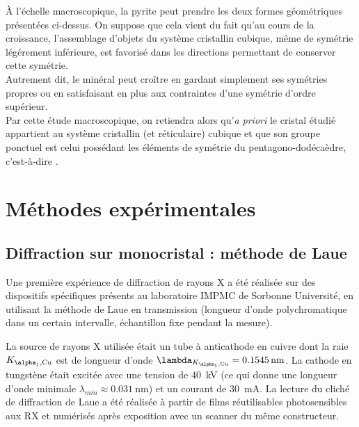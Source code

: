 À l'échelle macroscopique, la pyrite peut prendre les deux formes géométriques présentées ci-dessus. On suppose que cela vient du fait qu'au cours de la croissance, l'assemblage d'objets du système cristallin cubique, même de symétrie légérement inférieure, est favorisé dans les directions permettant de conserver cette symétrie.\\
Autrement dit, le minéral peut croître en gardant simplement ses symétries propres ou en satisfaisant en plus aux contraintes d'une symétrie d'ordre supérieur.\\
Par cette étude macroscopique, on retiendra alors qu'\textit{a priori} le cristal étudié appartient au système cristallin (et réticulaire) cubique et que son groupe ponctuel est celui possédant les éléments de symétrie du pentagono-dodécaèdre, c'est-à-dire .

\section{Méthodes expérimentales}

\subsection{Diffraction sur monocristal : méthode de Laue}

Une première expérience de diffraction de rayons X a été réalisée sur des dispositifs spécifiques présents au laboratoire IMPMC de Sorbonne Université, en utilisant la méthode de Laue en transmission (longueur d'onde polychromatique dans un certain intervalle, échantillon fixe pendant la mesure).

La source de rayons X utilisée était un tube à anticathode en cuivre dont la raie \(K_{\alpha_1,\ce{Cu}}\) est de longueur d'onde \(\lambda_{K_{\alpha_1,\ce{Cu}}}=\SI{0.1545}{\nano\metre}\). La cathode en tungstène était excitée avec une tension de \SI{40}{\kilo\volt} (ce qui donne une longueur d'onde minimale \(\lambda_{min} \approx \SI{0.031}{\nano\metre}\)) et un courant de \SI{30}{\milli\ampere}. La lecture du cliché de diffraction de Laue a été réalisée à partir de films réutilisables photosensibles aux RX et numérisés après exposition avec un scanner du même constructeur.

